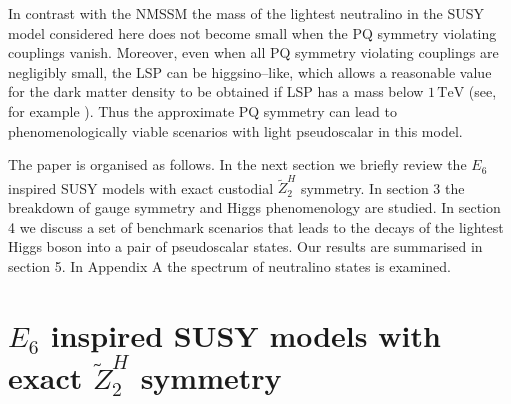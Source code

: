 \documentclass[12pt,a4paper]{article}
\begin{document}
In contrast with the NMSSM the mass of the lightest neutralino in the
SUSY model considered here does not become small when the PQ symmetry
violating couplings vanish. Moreover, even when all PQ symmetry
violating couplings are negligibly small, the LSP can be
higgsino--like, which allows a reasonable value for the dark matter
density to be obtained if LSP has a mass below $1\,\mbox{TeV}$ (see,
for example \cite{ArkaniHamed:2006mb}). Thus the approximate PQ
symmetry can lead to phenomenologically viable scenarios with light
pseudoscalar in this model.

The paper is organised as follows. In the next section we briefly review the $E_6$ inspired SUSY models with exact
custodial $\tilde{Z}^{H}_2$ symmetry. In section 3 the breakdown of gauge symmetry and Higgs phenomenology
are studied. In section 4 we discuss a set of benchmark scenarios that leads to the decays of the lightest Higgs boson
into a pair of pseudoscalar states. Our results are summarised in section 5. In Appendix A the spectrum of neutralino
states is examined.



\section{$E_6$ inspired SUSY models with exact $\tilde{Z}^{H}_2$ symmetry}
\end{document}
